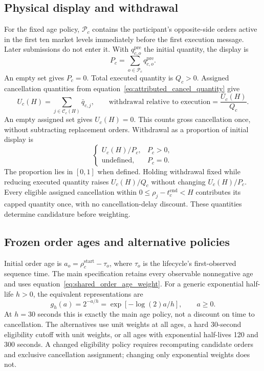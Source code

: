 \subsection{Physical display and withdrawal}
For the fixed age policy, $\mathcal P_c$ contains the participant's opposite-side orders active in the first ten market levels immediately before the first execution message. Later submissions do not enter it. With $q^{\mathrm{pre}}_{c,o}$ the initial quantity, the display is
\begin{equation}
    P_c=\sum_{o\in\mathcal P_c}q^{\mathrm{pre}}_{c,o}.
    \label{eq:age_conditioned_candidate_quantity}
\end{equation}
An empty set gives $P_c=0$. Total executed quantity is $Q_c>0$. Assigned cancellation quantities from equation~\eqref{eq:attributed_cancel_quantity} give
\begin{equation}
    U_c(H)=\sum_{j\in\mathcal C_c(H)}\bar q_{c,j},
    \qquad \text{withdrawal relative to execution}=\frac{U_c(H)}{Q_c}.
    \label{eq:assigned_withdrawal}
\end{equation}
An empty assigned set gives $U_c(H)=0$. This counts gross cancellation once, without subtracting replacement orders. Withdrawal as a proportion of initial display is
\begin{equation}
    \begin{cases}
        U_c(H)/P_c,&P_c>0,\\
        \text{undefined},&P_c=0.
    \end{cases}
    \label{eq:assigned_withdrawal_share}
\end{equation}
The proportion lies in $[0,1]$ when defined. Holding withdrawal fixed while reducing executed quantity raises $U_c(H)/Q_c$ without changing $U_c(H)/P_c$. Every eligible assigned cancellation within $0\leq\rho_j-t_c^{\mathrm{end}}<H$ contributes its capped quantity once, with no cancellation-delay discount. These quantities determine candidature before weighting.

\subsection{Frozen order ages and alternative policies}
Initial order age is $a_o=\rho_c^{\mathrm{start}}-\tau_o$, where $\tau_o$ is the lifecycle's first-observed sequence time. The main specification retains every observable nonnegative age and uses equation~\eqref{eq:shared_order_age_weight}. For a generic exponential half-life $h>0$, the equivalent representations are
\begin{equation}
    g_h(a)=2^{-a/h}=\exp[-\log(2)a/h],\qquad a\geq0.
    \label{eq:generic_age_half_life}
\end{equation}
At $h=30$ seconds this is exactly the main age policy, not a discount on time to cancellation. The alternatives use unit weights at all ages, a hard 30-second eligibility cutoff with unit weights, or all ages with exponential half-lives 120 and 300 seconds. A changed eligibility policy requires recomputing candidate orders and exclusive cancellation assignment; changing only exponential weights does not.


